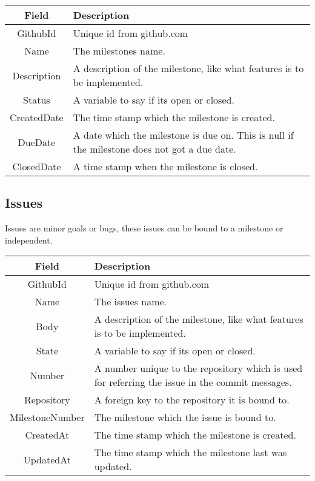 \vspace{0.5cm}
\begin{tabularx}{\linewidth}{| c | X |}
    \hline
    \rowcolor[gray]{0.8}
    \textbf{Field} & \textbf{Description} \\
    \hline
    GithubId & Unique id from github.com\\ \hline
    Name & The milestones name.\\ \hline
   	Description & A description of the milestone, like what features is to be implemented.\\ \hline
    Status & A variable to say if its open or closed.\\ \hline
    CreatedDate & The time stamp which the milestone is created.\\ \hline
    DueDate & A date which the milestone is due on. This is null if the milestone does not got a due date.\\ \hline
    ClosedDate & A time stamp when the milestone is closed.\\ 
    \hline
\end{tabularx}
\vspace{0.5cm}

\subsection*{Issues}
Issues are minor goals or bugs, these issues can be bound to a milestone or independent. \\

\vspace{0.5cm}
\begin{tabularx}{\linewidth}{| c | X |}
    \hline
    \rowcolor[gray]{0.8}
    \textbf{Field} & \textbf{Description} \\
    \hline
    GithubId & Unique id from github.com\\ \hline
    Name & The issues name.\\ \hline
   	Body & A description of the milestone, like what features is to be implemented.\\ \hline
    State & A variable to say if its open or closed.\\ \hline
    Number & A number unique to the repository which is used for referring the issue in the commit messages.\\ \hline
    Repository & A foreign key to the repository it is bound to.\\ \hline
    MilestoneNumber & The milestone which the issue is bound to.\\ \hline
    CreatedAt & The time stamp which the milestone is created.\\ \hline
    UpdatedAt & The time stamp which the milestone last was updated.\\ 
    \hline
\end{tabularx}
\vspace{0.5cm}

